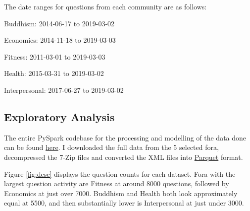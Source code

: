 \documentclass[11pt,preprint, authoryear]{article}
\numberwithin{equation}{section}
\begin{document}

The date ranges for questions from each community are as follows:

Buddhism: 2014-06-17 to 2019-03-02

Economics: 2014-11-18 to 2019-03-03

Fitness: 2011-03-01 to 2019-03-03

Health: 2015-03-31 to 2019-03-02

Interpersonal: 2017-06-27 to 2019-03-02

\subsection{Exploratory Analysis}\label{exploratory-analysis}

The entire PySpark codebase for the processing and modelling of the data
done can be found
\href{https://github.com/BCallumCarr/msc-lse-thesis/tree/master/01-python-code}{here}.
I downloaded the full data from the 5 selected fora, decompressed the
7-Zip files and converted the XML files into
\href{https://parquet.apache.org}{Parquet} format.

Figure \ref{fig:desc} displays the question counts for each dataset.
Fora with the largest question activity are Fitness at around 8000
questions, followed by Economics at just over 7000. Buddhism and Health
both look approximately equal at 5500, and then substantially lower is
Interpersonal at just under 3000.

\footnotesize
\end{document}
